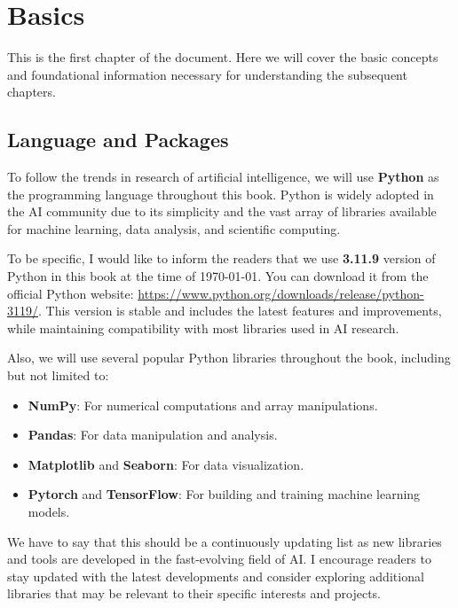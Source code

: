 \chapter{Basics}

This is the first chapter of the document. Here we will cover the basic concepts and foundational information necessary for understanding the subsequent chapters.

\section{Language and Packages}

To follow the trends in research of artificial intelligence, we will use \textbf{Python} as the programming language throughout this book. Python is widely adopted in the AI community due to its simplicity and the vast array of libraries available for machine learning, data analysis, and scientific computing.

To be specific, I would like to inform the readers that we use \textbf{3.11.9} version of Python in this book at the time of \today. You can download it from the official Python website: \url{https://www.python.org/downloads/release/python-3119/}. This version is stable and includes the latest features and improvements, while maintaining compatibility with most libraries used in AI research.

Also, we will use several popular Python libraries throughout the book, including but not limited to:

\begin{itemize}
    \item \textbf{NumPy}: For numerical computations and array manipulations.
    \item \textbf{Pandas}: For data manipulation and analysis.
    \item \textbf{Matplotlib} and \textbf{Seaborn}: For data visualization.
    \item \textbf{Pytorch} and \textbf{TensorFlow}: For building and training machine learning models.
\end{itemize}

We have to say that this should be a continuously updating list as new libraries and tools are developed in the fast-evolving field of AI. I encourage readers to stay updated with the latest developments and consider exploring additional libraries that may be relevant to their specific interests and projects.

\newpage


